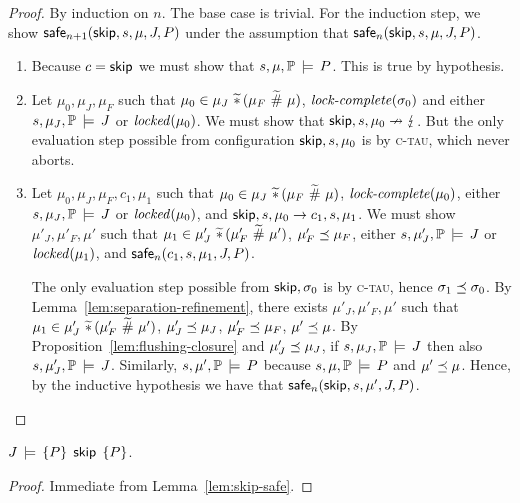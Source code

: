 \documentclass[11pt]{report}         %
\begin{document}
\begin{proof}
      By induction on $n$. The base case is trivial. For the induction step, we show $\mathsf{safe}_{n+1}(\operatorname{\mathsf{skip}},s,\mu,J,P)$ under the assumption that $\mathsf{safe}_{n}(\operatorname{\mathsf{skip}},s,\mu,J,P)$. 
      \begin{enumerate}
            \item Because $c = \operatorname{\mathsf{skip}}$ we must show that $s,\mu,\mathbb{P} \,\models\, P$. This is true by hypothesis. 

            \item Let $\mu_0,\mu_J,\mu_F$ such that $\mu_0 \in \mu_J \operatorname{\,\widetilde{\ast}\,} (\mu_F \operatorname{\,\widetilde{\#}\,} \mu)$, $\text{\textit{lock-complete}}(\sigma_0)$ and either $s,\mu_J,\mathbb{P} \,\models\, J$ or $\mathit{locked}(\mu_0)$. We must show that $\operatorname{\mathsf{skip}},s,\mu_0 \nrightarrow \lightning$. But the only evaluation step possible from configuration $\operatorname{\mathsf{skip}},s,\mu_0$ is by \textsc{c-tau}, which never aborts. 

            \item Let $\mu_0,\mu_J,\mu_F,c_1,\mu_1$ such that $\mu_0 \in \mu_J \operatorname{\,\widetilde{\ast}\,} (\mu_F \operatorname{\,\widetilde{\#}\,} \mu)$, $\text{\textit{lock-complete}}(\mu_0)$, either $s,\mu_J,\mathbb{P} \,\models\, J$ or $\mathit{locked}(\mu_0)$, and $\operatorname{\mathsf{skip}},s,\mu_0 \rightarrow c_1,s,\mu_1$. We must show $\mu'_J,\mu'_F,\mu'$ such that $\mu_1 \in \mu'_J \operatorname{\,\widetilde{\ast}\,} (\mu'_F \operatorname{\,\widetilde{\#}\,} \mu')$, $\mu'_F \preceq \mu_F$, either $s,\mu'_J,\mathbb{P} \,\models\, J$ or $\mathit{locked}(\mu_1)$, and $\mathsf{safe}_{n}(c_1,s,\mu_1,J,P)$.

            The only evaluation step possible from $\operatorname{\mathsf{skip}},\sigma_0$ is by \textsc{c-tau}, hence $\sigma_1 \preceq \sigma_0$. By Lemma~\ref{lem:separation-refinement}, there exists $\mu'_J,\mu'_F,\mu'$ such that $\mu_1 \in \mu'_J \operatorname{\,\widetilde{\ast}\,} (\mu'_F \operatorname{\,\widetilde{\#}\,} \mu')$, $\mu'_J \preceq \mu_J$, $\mu'_F \preceq \mu_F$, $\mu' \preceq \mu$. By Proposition~\ref{lem:flushing-closure} and $\mu'_J \preceq \mu_J$, if $s,\mu_J,\mathbb{P} \,\models\, J$ then also $s,\mu'_J,\mathbb{P} \,\models\, J$. Similarly, $s,\mu',\mathbb{P} \,\models\, P$ because $s,\mu,\mathbb{P} \,\models\, P$ and $\mu' \preceq \mu$. Hence, by the inductive hypothesis we have that $\mathsf{safe}_{n}(\operatorname{\mathsf{skip}},s,\mu',J,P)$. 
      \end{enumerate}
\end{proof}

\begin{lemma}
      \label{lem:skip-sound}
      $J\,\models\,\left\lbrace P \right\rbrace\;\operatorname{\mathsf{skip}}\;\left\lbrace P \right\rbrace$. 
\end{lemma}

\begin{proof}
      Immediate from Lemma~\ref{lem:skip-safe}. 
\end{proof}
\end{document}
